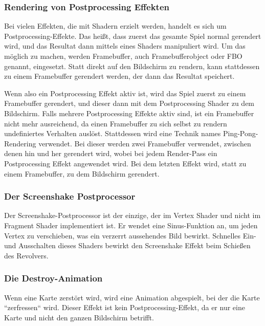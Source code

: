 \subsubsection{Rendering von Postprocessing Effekten}\label{subsubsec:postprocessing-effects}

Bei vielen Effekten, die mit Shadern erzielt werden, handelt es sich um Postprocessing-Effekte.
Das heißt, dass zuerst das gesamte Spiel normal gerendert wird, und das Resultat dann mittels eines Shaders
manipuliert wird.
Um das möglich zu machen, werden Framebuffer, auch Framebufferobject oder FBO genannt, eingesetzt.
Statt direkt auf den Bildschirm zu rendern, kann stattdessen zu einem Framebuffer gerendert werden, der dann das
Resultat speichert.

Wenn also ein Postprocessing Effekt aktiv ist, wird das Spiel zuerst zu einem Framebuffer gerendert, und dieser dann
mit dem Postprocessing Shader zu dem Bildschirm.
Falls mehrere Postprocessing Effekte aktiv sind, ist ein Framebuffer nicht mehr ausreichend, da einen Framebuffer
zu sich selbst zu rendern undefiniertes Verhalten auslöst.
Stattdessen wird eine Technik names Ping-Pong-Rendering verwendet.
Bei dieser werden zwei Framebuffer verwendet, zwischen denen hin und her gerendert wird, wobei bei jedem Render-Pass ein
Postprocessing Effekt angewendet wird.
Bei dem letzten Effekt wird, statt zu einem Framebuffer, zu dem Bildschirm gerendert.

\subsubsection{Der Screenshake Postprocessor}

Der Screenshake-Postprocessor ist der einzige, der im Vertex Shader und nicht im Fragment Shader implementiert ist.
Er wendet eine Sinus-Funktion an, um jeden Vertex zu verschieben, was ein verzerrt aussehendes Bild bewirkt.
Schnelles Ein- und Ausschalten dieses Shaders bewirkt den Screenshake Effekt beim Schießen des Revolvers.

\subsubsection{Die Destroy-Animation}

Wenn eine Karte zerstört wird, wird eine Animation abgespielt, bei der die Karte ``zerfressen`` wird.
Dieser Effekt ist kein Postprocessing-Effekt, da er nur eine Karte und nicht den ganzen Bildschirm betrifft.

